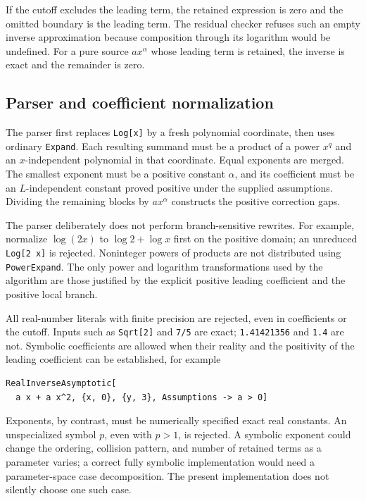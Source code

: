 \documentclass[11pt,a4paper]{article}
\numberwithin{equation}{section}
\theoremstyle{definition}\newtheorem{definition}[theorem]{Definition}
\theoremstyle{remark}\newtheorem{remark}[theorem]{Remark}
\DeclareRobustCommand{\code}[1]{{\small\ttfamily\urlstyle{same}\nolinkurl{#1}}}
\begin{document}
If the cutoff excludes the leading term, the retained expression is zero
and the omitted boundary is the leading term. The residual checker refuses
such an empty inverse approximation because composition through its
logarithm would be undefined. For a pure source \(a x^\alpha\) whose leading
term is retained, the inverse is exact and the remainder is zero.

\subsection{Parser and coefficient normalization}
The parser first replaces \code{Log[x]} by a fresh polynomial coordinate,
then uses ordinary \code{Expand}. Each resulting summand must be a product
of a power \(x^q\) and an \(x\)-independent polynomial in that coordinate.
Equal exponents are merged. The smallest exponent must be a positive
constant \(\alpha\), and its coefficient must be an \(L\)-independent
constant proved positive under the supplied assumptions. Dividing the
remaining blocks by \(a x^\alpha\) constructs the positive correction gaps.

The parser deliberately does not perform branch-sensitive rewrites. For
example, normalize \(\log(2x)\) to \(\log2+\log x\) first on the positive
domain; an unreduced \code{Log[2 x]} is rejected. Noninteger powers of
products are not distributed using \code{PowerExpand}. The only power and
logarithm transformations used by the algorithm are those justified by the
explicit positive leading coefficient and the positive local branch.

All real-number literals with finite precision are rejected, even in
coefficients or the cutoff. Inputs such as \code{Sqrt[2]} and \code{7/5}
are exact; \code{1.41421356} and \code{1.4} are not. Symbolic coefficients
are allowed when their reality and the positivity of the leading
coefficient can be established, for example
\begin{lstlisting}
RealInverseAsymptotic[
  a x + a x^2, {x, 0}, {y, 3}, Assumptions -> a > 0]
\end{lstlisting}
Exponents, by contrast, must be numerically specified exact real constants.
An unspecialized symbol \(p\), even with \(p>1\), is rejected. A symbolic
exponent could change the ordering, collision pattern, and number of retained
terms as a parameter varies; a correct fully symbolic implementation would
need a parameter-space case decomposition. The present implementation does
not silently choose one such case.
\end{document}

